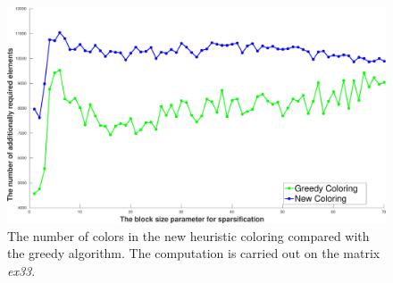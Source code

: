 \documentclass[12pt, twoside,a4paper,toc=bibliography]{scrbook}
\begin{document}
\begin{figure}
\centering
\includegraphics[width=0.9\linewidth]{bls_adds_ex33_without_alpha}
\caption{The number of colors in the new heuristic coloring compared with the greedy algorithm.
The computation is carried out on the matrix \textit{ex33}. }
\label{bls_adds_ex33_without_alpha}
\end{figure}
\end{document}
